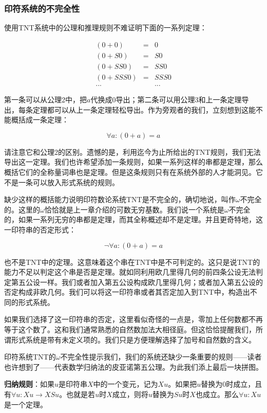 \documentclass[b5paper]{ctexart}
\begin{document}
\subsubsection{印符系统的不完全性}

使用TNT系统中的公理和推理规则不难证明下面的一系列定理：

\[
\begin{array}{rcl}
(0 + 0) & = & 0 \\
(0 + S0) & = & S0 \\
(0 + SS0) & = & SS0 \\
(0 + SSS0) & = & SSS0 \\
... & & ...
\end{array}
\]

第一条可以从公理2中，把$a$代换成0导出；第二条可以用公理3和上一条定理导出，每条定理都可以从上一条定理轻松导出。作为旁观者的我们，立刻想到这能不能概括成一条定理：

\[
\forall a: (0 + a) = a
\]

请注意它和公理2的区别。遗憾的是，利用迄今为止所给出的TNT规则，我们无法导出这一定理。我们也许希望添加一条规则，如果一系列这样的串都是定理，那么概括它们的全称量词串也是定理。但是这条规则只有在系统外部的人才能洞见。它不是一条可以放入形式系统的规则。

缺少这样的概括能力说明印符数论系统TNT是不完全的，确切地说，叫作$\omega$不完全的。这里的$\omega$恰恰就是上一章介绍的可数无穷基数。我们说一个系统是$\omega$不完全的，如果一系列无穷的串都是定理，而其全称概述却不是定理。并且更奇特地，这一印符串的否定形式：

\[
\lnot \forall a: (0 + a) = a
\]

也不是TNT中的定理。这意味着这个串在TNT中是不可判定的。这只是说TNT的能力不足以判定这个串是否是定理。就如同利用欧几里得几何的前四条公设无法判定第五公设一样。我们或者加入第五公设构成欧几里得几何；或者加入第五公设的否定构成非欧几何。我们可以将这一印符串或者其否定加入到TNT中，构造出不同的形式系统。

如果我们选择了这一印符串的否定，这里看似奇怪的一点是，零加上任何数都不再等于这个数了。这和我们通常熟悉的自然数加法大相径庭。但这恰恰提醒我们，所谓形式系统是带有未定义项的。我们只是方便理解选择了加号和自然数的含义。

印符系统TNT的$\omega$不完全性提示我们，我们的系统还缺少一条重要的规则——读者也许想到了——代表数学归纳法的皮亚诺第五公理。为此我们添上最后一块拼图。

\textbf{归纳规则}：如果$u$是印符串$X$中的一个变元，记为$X{u}$。如果把$u$替换为0时成立，且有$\forall u: X{u} \to X{Su}$。也就是若$u$时$X$成立，则将$u$替换为$Su$时$X$也成立。那么$\forall u: X{u}$是一个定理。
\end{document}
